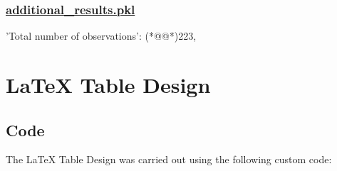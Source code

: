 \documentclass[11pt]{article}
\begin{document}
\subsubsection*{\hyperlink{code-Data Analysis-additional-results-pkl}{additional\_results.pkl}}

\begin{codeoutput}
{
    'Total number of observations': (*@@*)223,
}
\end{codeoutput}

\section{LaTeX Table Design}
\subsection{{Code}}
The LaTeX Table Design was carried out using the following custom code:
\end{document}
